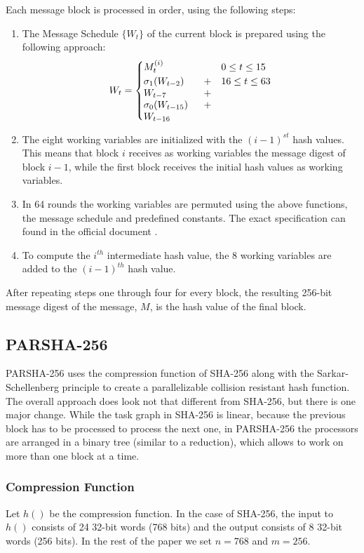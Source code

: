 \documentclass[letterpaper]{article}
\begin{document}
Each message block is processed in order, using the following steps:
\begin{enumerate}
\item The Message Schedule $\{ W_t \}$ of the current block is prepared using the following approach:\\
$$W_t = \begin{cases}
M_t^{(i)} & 0 \leq t \leq 15 \\
 \parbox[t]{.2\textwidth}{$\sigma_1(W_{t-2})+ W_{t-7} + \sigma_0(W_{t-15})+W_{t-16}$} & 16 \leq t \leq 63
\end{cases}$$

\item The eight  working variables are initialized with the  $(i-1)^{st}$ hash values. This means that block $i$ receives as working variables the message digest of block $i-1$, while the first block receives the initial hash values as working variables. 

\item In 64 rounds the working variables are permuted using the above functions, the message schedule and predefined constants. The exact specification can found in the official document \cite{sha}. 

\item To compute the $i^{th}$ intermediate hash value, the 8 working variables are added to the $(i-1)^{th}$ hash value.


\end{enumerate}

After repeating steps one through four  for every block, the resulting 256-bit message digest of the message, $M$, is the hash value of the final block.

\subsection{PARSHA-256 \cite{parsha256}}
PARSHA-256 uses the compression function of SHA-256 along with the Sarkar-Schellenberg \cite{sarkar} principle to create a parallelizable collision resistant hash function. The overall approach does look not that different from SHA-256, but there is one major change. While the task graph in SHA-256 is linear, because the previous block has to be processed to process the next one, in PARSHA-256 the processors are arranged in a binary tree (similar to a reduction), which allows to work on more than one block at a time. 

\subsubsection{Compression Function}
Let $h()$ be the compression function. In the case of SHA-256, the input to $h()$ consists of 24 32-bit words (768 bits) and the output consists of 8 32-bit words (256 bits). In the rest of the paper we set $n = 768$ and $m = 256$.
\end{document}
